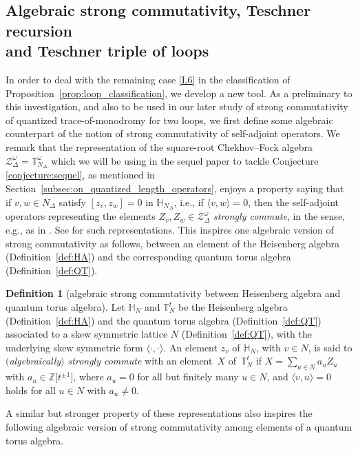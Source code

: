 \documentclass[10pt,a4paper]{amsart}
\numberwithin{equation}{section}
\theoremstyle{definition}
\newtheorem{Definition}[Theorem]{Definition}
\begin{document}
\subsection[Algebraic strong commutativity, Teschner recursion and Teschner triple of loops]{Algebraic strong commutativity, Teschner recursion\\ and Teschner triple of loops}
\label{subsec:Teschner_recursion}
In order to deal with the remaining case \ref{L6} in the classification of Proposition~\ref{prop:loop_classification}, we develop a new tool.
As a preliminary to this investigation, and also to be used in our later study of strong commutativity of quantized trace-of-monodromy for two loops, we first define some algebraic counterpart of the notion of strong commutativity of self-adjoint operators.
We remark that the representation of the square-root Chekhov--Fock algebra $\mathcal{Z}^\omega_\Delta = \mathbb{T}^\omega_{N_\Delta}$ which we will be using in the sequel paper \cite{sequel} to tackle Conjecture \ref{conjecture:sequel}, as mentioned in Section~\ref{subsec:on_quantized_length_operators}, enjoys a property saying that if $v,w\in N_\Delta$ satisfy $[z_v, z_w] =0$ in $\mathbb{H}_{N_\Delta}$, i.e., if $\langle v,w\rangle =0$, then the self-adjoint operators representing the elements $Z_v, Z_w \in \mathcal{Z}^\omega_\Delta$ {\em strongly commute}, in the sense, e.g., as in \cite[Section~VIII.5]{RS}. See \cite{FG09, Kim_irreducible} for such representations. This inspires one algebraic version of strong commutativity as follows, between an element of the Heisenberg algebra (Definition~\ref{def:HA}) and the corresponding quantum torus algebra (Definition~\ref{def:QT}).
\begin{Definition}[algebraic strong commutativity between Heisenberg algebra and quantum torus algebra]
\label{def:algebraic_SC1}
Let $\mathbb{H}_N$ and $\mathbb{T}^t_N$ be the Heisenberg algebra (Definition~\ref{def:HA}) and the quantum torus algebra (Definition~\ref{def:QT}) associated to a skew symmetric lattice $N$ (Definition~\ref{def:QT}), with the underlying skew symmetric form $\langle \cdot,\cdot \rangle$.
An element $z_v$ of $\mathbb{H}_N$, with $v\in N$, is said to {\em $($algebraically$)$ strongly commute} with an element~$X$ of~$\mathbb{T}^t_N$ if $X = \sum_{u \in N} a_u Z_u$ with $a_u \in \mathbb{Z}\bigl[t^{\pm 1}\bigr]$, where $a_u =0$ for all but finitely many $u\in N$, and $\langle v,u\rangle=0$ holds for all $u\in N$ with $a_u \neq0$.
\end{Definition}
A similar but stronger property of these representations also inspires the following algebraic version of strong commutativity among elements of a quantum torus algebra.
\end{document}
